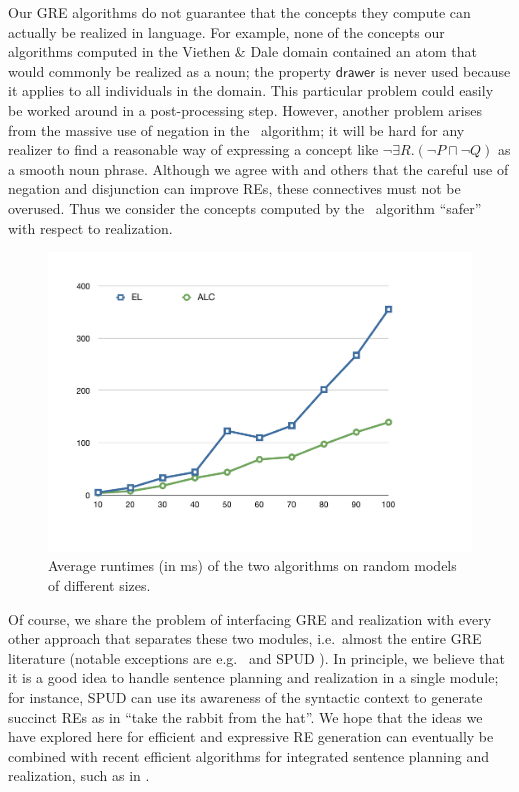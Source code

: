 Our GRE algorithms do not guarantee that the concepts they compute can
actually be realized in language.  For example, none of the concepts
our algorithms computed in the Viethen \& Dale domain contained an
atom that would commonly be realized as a noun; the property
$\mathsf{drawer}$ is never used because it applies to all individuals
in the domain.  This particular problem could easily be worked around
in a post-processing step.  However, another problem arises from the
massive use of negation in the \alc\ algorithm; it will be hard for
any realizer to find a reasonable way of expressing a concept like
$\neg \exists R.(\neg P \sqcap \neg Q)$ as a smooth noun phrase.
Although we agree with  and
others that the careful use of negation and disjunction can improve
REs, these connectives must not be overused.  Thus we consider the
concepts computed by the \el\ algorithm ``safer'' with respect to
realization.


\begin{figure}[t]
  \centering
  \includegraphics[width=\columnwidth]{runtimes}
  \caption{Average runtimes (in ms) of the two algorithms on random
    models of     different sizes.} 
  \label{fig:runtimes}
\end{figure}

Of course, we share the problem of interfacing GRE and realization
with every other approach that separates these two modules, i.e.\
almost the entire GRE literature (notable exceptions are e.g.\
 and SPUD \cite{Stone1998a}).  In principle, we
believe that it is a good idea to handle sentence planning and
realization in a single module; for instance, SPUD can use its
awareness of the syntactic context to generate succinct REs as in
``take the rabbit from the hat''.  We hope that the ideas we have
explored here for efficient and expressive RE generation can
eventually be combined with recent efficient algorithms for integrated
sentence planning and realization, such as in .

